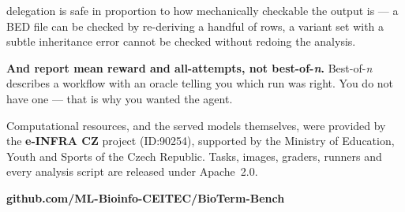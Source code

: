 \documentclass[final]{article}
\newcommand{\sz}[2]{\fontsize{#1}{#2}\selectfont}
\newcommand{\body}{\sz{21}{29}}
\newcommand{\bodysm}{\sz{18.5}{25}}
\newcommand{\lead}[1]{{\dsp\bfseries\color{btink}#1}}
\begin{document}
\begin{tcolorbox}[card, left=14mm, right=14mm, top=11mm, bottom=11mm]
  \begin{minipage}[t]{0.695\linewidth}\vspace{0pt}\raggedright
    {\body\lead{Rule of thumb:} delegation is safe in proportion to how
    mechanically checkable the output is --- a BED file can be checked by
    re-deriving a handful of rows, a variant set with a subtle inheritance
    error cannot be checked without redoing the analysis.\par
    \vspace{5mm}
    \lead{And report mean reward and all-attempts, not best-of-\emph{n}.}
    Best-of-\emph{n} describes a workflow with an oracle telling you which run
    was right. You do not have one --- that is why you wanted the agent.\par}
    \vspace{7mm}
    {\bodysm\color{btmuted}Computational resources, and the served models
      themselves, were provided by the \textbf{e-INFRA CZ} project (ID:90254),
      supported by the Ministry of Education, Youth and Sports of the Czech
      Republic. Tasks, images, graders, runners and every analysis script are
      released under Apache~2.0.\par}
  \end{minipage}%
  \hfill
  \begin{minipage}[t]{0.265\linewidth}\vspace{0pt}
    \raggedleft
    {\dsp\bfseries\sz{18}{24}\color{btink}%
     github.com/ML-Bioinfo-CEITEC/BioTerm-Bench\par}
    \vspace{6mm}
  \end{minipage}
\end{tcolorbox}
\end{document}
